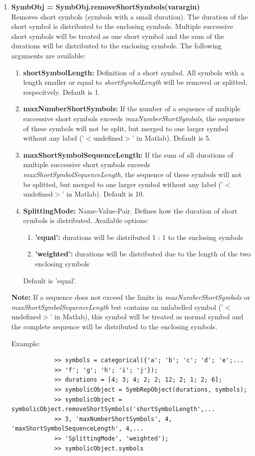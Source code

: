 \documentclass[a4]{scrreprt}
\begin{document}
\begin{enumerate}
		\item \textbf{SymbObj = SymbObj.removeShortSymbols(varargin)}\\
			Removes short symbols (symbols with a small duration). The duration of the short symbol is distributed to the enclosing symbols. Multiple successive short symbols will be treated as one short symbol and the sum of the durations will be distributed to the enclosing symbols. The following arguments are available:
			\begin{enumerate}
				\item \textbf{shortSymbolLength: } Definition of a short symbol. All symbols with a length smaller or equal to \textit{shortSymbolLength} will be removed or splitted, respecitvely. Default is 1.
				\item \textbf{maxNumberShortSymbols: } If the number of a sequence of multiple successive short symbols exceeds \textit{maxNumberShortSymbols}, the sequence of these symbols will not be split, but merged to one larger symbol without any label ('$<$undefined$>$' in Matlab). Default is 5.
				\item \textbf{maxShortSymbolSequenceLength: } If the sum of all durations of multiple successive short symbols exceeds \textit{maxShortSymbolSequenceLength}, the sequence of these symbols will not be splitted, but merged to one larger symbol without any label ('$<$undefined$>$' in Matlab). Default is 10.
				\item \textbf{SplittingMode: } Name-Value-Pair. Defines how the duration of short symbols is distributed. Available options: 
				\begin{enumerate}
					\item \textbf{'equal':} durations will be distributed 1 : 1 to the enclosing symbols
					\item \textbf{'weighted':} durations will be distributed due to the length of the two enclosing symbols
				\end{enumerate}
				Default is 'equal'.	
			\end{enumerate}
			
			\textbf{Note:} If a sequence does not exceed the limits in \textit{maxNumberShortSymbols} or \textit{maxShortSymbolSequenceLength} but contains an unlabelled symbol ('$<$undefined$>$' in Matlab), this symbol will be treated as normal symbol and the complete sequence will be distributed to the enclosing symbols.
			
			Example:
			
			\begin{verbatim}
			>> symbols = categorical({'a'; 'b'; 'c'; 'd'; 'e';...
			>> 'f'; 'g'; 'h'; 'i'; 'j'});
			>> durations = [4; 3; 4; 2; 2; 12; 2; 1; 2; 6];
			>> symbolicObject = SymbRepObject(durations, symbols);
			>> symbolicObject = symbolicObject.removeShortSymbols('shortSymbolLength',...
			>> 3, 'maxNumberShortSymbols', 4, 'maxShortSymbolSequenceLength', 4,...
			>> 'SplittingMode', 'weighted');
			>> symbolicObject.symbols
			

\end{verbatim}
\end{enumerate}
\end{document}
